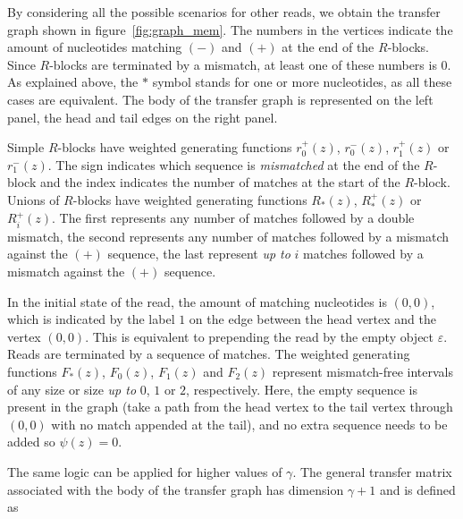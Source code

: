 \documentclass{article}
\begin{document}
By considering all the possible scenarios for other reads, we obtain the
transfer graph shown in figure~\ref{fig:graph_mem}. The numbers in the
vertices indicate the amount of nucleotides matching $(-)$ and $(+)$ at
the end of the $R$-blocks. Since $R$-blocks are terminated by a mismatch,
at least one of these numbers is $0$. As explained above, the $*$ symbol
stands for one or more nucleotides, as all these cases are equivalent. The
body of the transfer graph is represented on the left panel, the head and
tail edges on the right panel.

Simple $R$-blocks have weighted generating functions $r_0^+(z)$,
$r_0^-(z)$, $r_1^+(z)$ or $r_1^-(z)$. The sign indicates which sequence
is \emph{mismatched} at the end of the $R$-block and the index indicates
the number of matches at the start of the $R$-block. Unions of $R$-blocks
have weighted generating functions $R_*(z)$, $R_*^+(z)$ or $R_i^+(z)$. The
first represents any number of matches followed by a double mismatch, the
second represents any number of matches followed by a mismatch against the
$(+)$ sequence, the last represent \emph{up to} $i$ matches followed by a
mismatch against the $(+)$ sequence.

In the initial state of the read, the amount of matching nucleotides is
$(0,0)$, which is indicated by the label $1$ on the edge between the head
vertex and the vertex $(0,0)$. This is equivalent to prepending the read
by the empty object $\varepsilon$. Reads are terminated by a sequence of
matches. The weighted generating functions $F_*(z)$, $F_0(z)$, $F_1(z)$
and $F_2(z)$ represent mismatch-free intervals of any size or size
\emph{up to} $0$, $1$ or $2$, respectively. Here, the empty sequence is
present in the graph (take a path from the head vertex to the tail vertex
through $(0,0)$ with no match appended at the tail), and no extra sequence
needs to be added so $\psi(z) = 0$. 

The same logic can be applied for higher values of $\gamma$. The general
transfer matrix associated with the body of the transfer graph has
dimension $\gamma+1$ and is defined as
\end{document}
